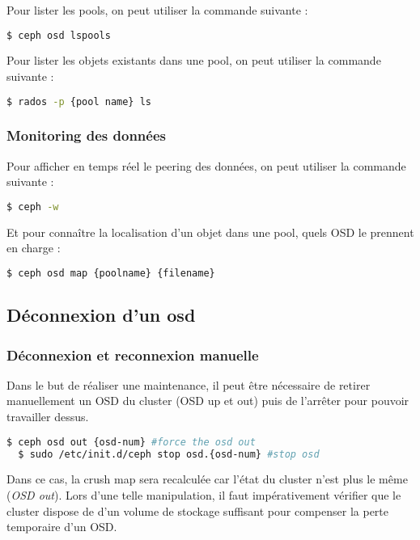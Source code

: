 Pour lister les pools, on peut utiliser la commande suivante :
\vspace{3mm}
\begin{lstlisting}[language=bash]
    $ ceph osd lspools
\end{lstlisting}
    Pour lister les objets existants dans une pool, on peut utiliser la commande suivante :
\vspace{3mm}
\begin{lstlisting}[language=bash]
    $ rados -p {pool name} ls
\end{lstlisting}
	

\subsubsection{Monitoring des données}
Pour afficher en temps réel le peering des données, on peut utiliser la commande suivante :
\vspace{3mm}
\begin{lstlisting}[language=bash]
	$ ceph -w
\end{lstlisting}
Et pour connaître la localisation d'un objet dans une pool, \ie quels OSD le prennent en charge :
\vspace{3mm}
\begin{lstlisting}[language=bash]
	$ ceph osd map {poolname} {filename}
\end{lstlisting}


\subsection{Déconnexion d'un osd}\label{deco}

\subsubsection{Déconnexion et reconnexion manuelle}

Dans le but de réaliser une maintenance, il peut être nécessaire de retirer manuellement un OSD du cluster (OSD up et out) puis de l’arrêter pour pouvoir travailler dessus.
\vspace{3mm}
\begin{lstlisting}[language=bash]
  $ ceph osd out {osd-num} #force the osd out
  $ sudo /etc/init.d/ceph stop osd.{osd-num} #stop osd
\end{lstlisting}

Dans ce cas, la crush map sera recalculée car l'état du cluster n'est plus le même (\textit{OSD out}). Lors d'une telle manipulation, il faut impérativement vérifier que le cluster dispose de d'un volume de stockage suffisant pour compenser la perte temporaire d'un OSD.

